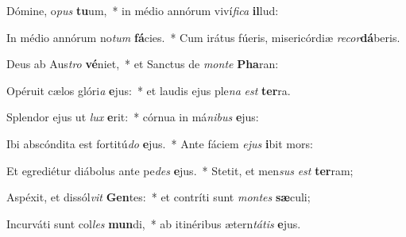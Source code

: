 \item Dómine, o\textit{pus} \textbf{tu}um,~* in médio annórum viví\textit{fi}\textit{ca} \textbf{il}lud:
\item In médio annórum no\textit{tum} \textbf{fá}cies.~* Cum irátus fúeris, misericórdiæ \textit{re}\textit{cor}\textbf{dá}beris.
\item Deus ab Aus\textit{tro} \textbf{vé}niet,~* et Sanctus de \textit{mon}\textit{te} \textbf{Pha}ran:
\item Opéruit cælos glóri\textit{a} \textbf{e}jus:~* et laudis ejus ple\textit{na} \textit{est} \textbf{ter}ra.
\item Splendor ejus ut \textit{lux} \textbf{e}rit:~* córnua in má\textit{ni}\textit{bus} \textbf{e}jus:
\item Ibi abscóndita est fortitú\textit{do} \textbf{e}jus.~* Ante fáciem \textit{e}\textit{jus} \textbf{i}bit mors:
\item Et egrediétur diábolus ante pe\textit{des} \textbf{e}jus.~* Stetit, et men\textit{sus} \textit{est} \textbf{ter}ram;
\item Aspéxit, et dissól\textit{vit} \textbf{Gen}tes:~* et contríti sunt \textit{mon}\textit{tes} \textbf{sæ}culi;
\item Incurváti sunt col\textit{les} \textbf{mun}di,~* ab itinéribus ætern\textit{tá}\textit{tis} \textbf{e}jus.

